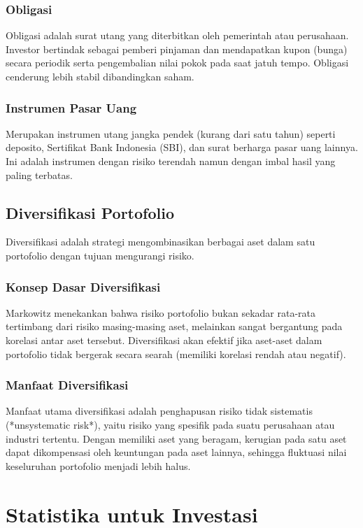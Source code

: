 \documentclass[12pt,a4paper]{book}
\begin{document}
\subsection{Obligasi}
Obligasi adalah surat utang yang diterbitkan oleh pemerintah atau perusahaan. Investor bertindak sebagai pemberi pinjaman dan mendapatkan kupon (bunga) secara periodik serta pengembalian nilai pokok pada saat jatuh tempo. Obligasi cenderung lebih stabil dibandingkan saham.

\subsection{Instrumen Pasar Uang}
Merupakan instrumen utang jangka pendek (kurang dari satu tahun) seperti deposito, Sertifikat Bank Indonesia (SBI), dan surat berharga pasar uang lainnya. Ini adalah instrumen dengan risiko terendah namun dengan imbal hasil yang paling terbatas.

\section{Diversifikasi Portofolio}
Diversifikasi adalah strategi mengombinasikan berbagai aset dalam satu portofolio dengan tujuan mengurangi risiko.

\subsection{Konsep Dasar Diversifikasi}
Markowitz menekankan bahwa risiko portofolio bukan sekadar rata-rata tertimbang dari risiko masing-masing aset, melainkan sangat bergantung pada korelasi antar aset tersebut. Diversifikasi akan efektif jika aset-aset dalam portofolio tidak bergerak secara searah (memiliki korelasi rendah atau negatif).

\subsection{Manfaat Diversifikasi}
Manfaat utama diversifikasi adalah penghapusan risiko tidak sistematis (*unsystematic risk*), yaitu risiko yang spesifik pada suatu perusahaan atau industri tertentu. Dengan memiliki aset yang beragam, kerugian pada satu aset dapat dikompensasi oleh keuntungan pada aset lainnya, sehingga fluktuasi nilai keseluruhan portofolio menjadi lebih halus.

\chapter{Statistika untuk Investasi}
\end{document}
